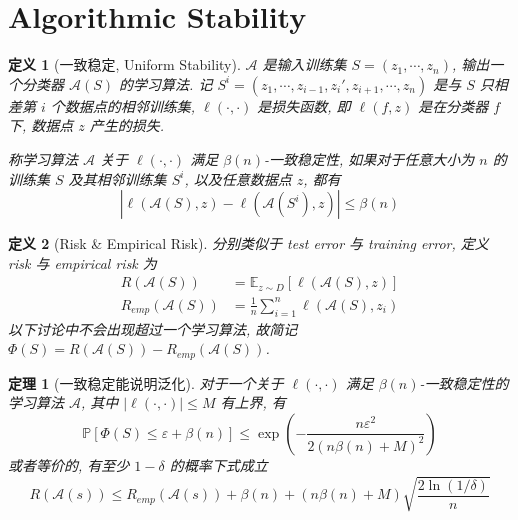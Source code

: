 \documentclass[8pt]{article}
\theoremstyle{compact}
\newtheorem{theorem}{定理}[section]
\newtheorem{definition}{定义}[section]
\def\le{\leqslant}
\def\P#1{\mathbb{P}\left[{#1}\right]}
\begin{document}
\section{Algorithmic Stability}
\begin{definition}[一致稳定, Uniform Stability]
	$\mathcal A$ 是输入训练集 $S = (z_1, \cdots, z_n)$, 输出一个分类器 $\mathcal A(S)$ 的学习算法. 记 $S^i = (z_1, \cdots, z_{i-1}, z_i', z_{i+1}, \cdots, z_n)$ 是与 $S$ 只相差第 $i$ 个数据点的相邻训练集, $\ell (\cdot, \cdot)$ 是损失函数, 即 $\ell(f, z)$ 是在分类器 $f$ 下, 数据点 $z$ 产生的损失.

	称学习算法 $\mathcal A$ 关于 $\ell(\cdot, \cdot)$ 满足 $\beta(n)$-一致稳定性, 如果对于任意大小为 $n$ 的训练集 $S$ 及其相邻训练集 $S^i$, 以及任意数据点 $z$, 都有 $$|\ell(\mathcal A(S), z) - \ell(\mathcal A(S^i), z)| \le \beta(n)$$
\end{definition}
\begin{definition}[Risk \& Empirical Risk]
	分别类似于 test error 与 training error, 定义 risk 与 empirical risk 为
	\begin{equation*}
		\begin{split}			
			R(\mathcal A(S)) &= \mathbb E_{z \sim D}[\ell(\mathcal A(S), z)]\\
			R_{emp}(\mathcal A(S)) &= \frac1n \sum_{i=1}^{n}\ell(\mathcal A(S), z_i)
		\end{split}
	\end{equation*}
	以下讨论中不会出现超过一个学习算法, 故简记 $\Phi(S) = R(\mathcal A(S)) - R_{emp}(\mathcal A(S))$.
\end{definition}
\begin{theorem}[一致稳定能说明泛化]
	对于一个关于 $\ell(\cdot, \cdot)$ 满足 $\beta(n)$-一致稳定性的学习算法 $\mathcal A$, 其中 $|\ell(\cdot, \cdot)| \le M$ 有上界, 有 $$\P{\Phi(S) \le \varepsilon + \beta(n)} \le \exp\left( -\frac{n\varepsilon^2}{2(n\beta(n) + M)^2} \right)$$ 或者等价的, 有至少 $1 - \delta$ 的概率下式成立 $$R(\mathcal A(s)) \le R_{emp}(\mathcal A(s)) + \beta(n) + (n\beta(n) + M)\sqrt{\frac{2\ln(1/\delta)}{n}}$$
\end{theorem}
\end{document}
